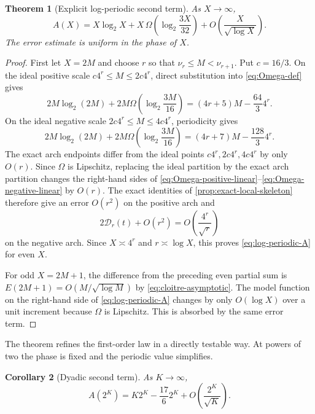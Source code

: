 \documentclass[11pt]{article}
\newtheorem{theorem}{Theorem}[section]
\newtheorem{corollary}[theorem]{Corollary}
\theoremstyle{definition}
\theoremstyle{remark}
\begin{document}
\begin{theorem}[Explicit log-periodic second term]
\label{thm:log-periodic-second-term}
As $X\to\infty$,
\begin{equation}
\boxed{
A(X)
=X\log_2X
+X\,\Omega\!\left(\log_2\frac{3X}{32}\right)
+O\!\left(\frac{X}{\sqrt{\log X}}\right).
}
\label{eq:log-periodic-A}
\end{equation}
The error estimate is uniform in the phase of $X$.
\end{theorem}

\begin{proof}
First let $X=2M$ and choose $r$ so that
$\nu_r\le M<\nu_{r+1}$.  Put $c=16/3$.
On the ideal positive scale $c4^r\le M\le2c4^r$, direct substitution into
\eqref{eq:Omega-def} gives
\begin{equation}
2M\log_2(2M)
+2M\Omega\!\left(\log_2\frac{3M}{16}\right)
=(4r+5)M-\frac{64}{3}4^r.
\label{eq:Omega-positive-linear}
\end{equation}
On the ideal negative scale $2c4^r\le M\le4c4^r$, periodicity gives
\begin{equation}
2M\log_2(2M)
+2M\Omega\!\left(\log_2\frac{3M}{16}\right)
=(4r+7)M-\frac{128}{3}4^r.
\label{eq:Omega-negative-linear}
\end{equation}
The exact arch endpoints differ from the ideal points
$c4^r,2c4^r,4c4^r$ by only $O(r)$.  Since $\Omega$ is Lipschitz, replacing
the ideal partition by the exact arch partition changes the right-hand sides
of \eqref{eq:Omega-positive-linear}--\eqref{eq:Omega-negative-linear} by
$O(r)$.  The exact identities of \cref{prop:exact-local-skeleton} therefore
give an error $O(r^2)$ on the positive arch and
\[
2\mathscr D_r(t)+O(r^2)
=O\!\left(\frac{4^r}{\sqrt r}\right)
\]
on the negative arch.  Since $X\asymp4^r$ and $r\asymp\log X$, this proves
\eqref{eq:log-periodic-A} for even $X$.

For odd $X=2M+1$, the difference from the preceding even partial sum is
$E(2M+1)=O(M/\sqrt{\log M})$ by \eqref{eq:cloitre-asymptotic}.  The model
function on the right-hand side of \eqref{eq:log-periodic-A} changes by only
$O(\log X)$ over a unit increment because $\Omega$ is Lipschitz.  This is
absorbed by the same error term.
\end{proof}

The theorem refines the first-order law in a directly testable way.
At powers of two the phase is fixed and the periodic value simplifies.

\begin{corollary}[Dyadic second term]
\label{cor:dyadic-second-term}
As $K\to\infty$,
\begin{equation}
{
A(2^K)
=K2^K-\frac{17}{6}2^K
+O\!\left(\frac{2^K}{\sqrt K}\right).
}
\label{eq:dyadic-A-second-term}
\end{equation}
\end{corollary}
\end{document}
